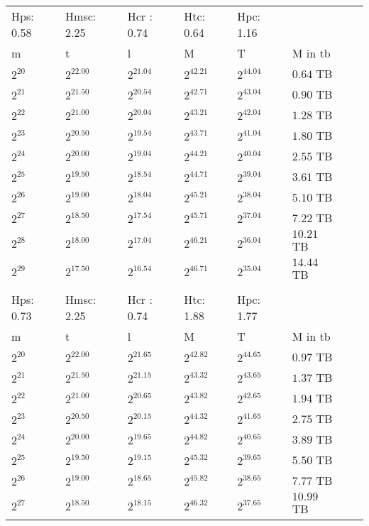\documentclass{article}
\begin{document}
\begin{tabular}{llllllll}
Hps: 0.58 & Hmsc: 2.25 & Hcr : 0.74 & Htc: 0.64 & Hpc: 1.16 &  \\
m & t & l & M & T & M in tb \\
$2^{20}$ & $2^{22.00}$ & $2^{21.04}$ & $2^{42.21}$ & $2^{44.04}$ & $0.64$ TB \\
$2^{21}$ & $2^{21.50}$ & $2^{20.54}$ & $2^{42.71}$ & $2^{43.04}$ & $0.90$ TB \\
$2^{22}$ & $2^{21.00}$ & $2^{20.04}$ & $2^{43.21}$ & $2^{42.04}$ & $1.28$ TB \\
$2^{23}$ & $2^{20.50}$ & $2^{19.54}$ & $2^{43.71}$ & $2^{41.04}$ & $1.80$ TB \\
$2^{24}$ & $2^{20.00}$ & $2^{19.04}$ & $2^{44.21}$ & $2^{40.04}$ & $2.55$ TB \\
$2^{25}$ & $2^{19.50}$ & $2^{18.54}$ & $2^{44.71}$ & $2^{39.04}$ & $3.61$ TB \\
$2^{26}$ & $2^{19.00}$ & $2^{18.04}$ & $2^{45.21}$ & $2^{38.04}$ & $5.10$ TB \\
$2^{27}$ & $2^{18.50}$ & $2^{17.54}$ & $2^{45.71}$ & $2^{37.04}$ & $7.22$ TB \\
$2^{28}$ & $2^{18.00}$ & $2^{17.04}$ & $2^{46.21}$ & $2^{36.04}$ & $10.21$ TB \\
$2^{29}$ & $2^{17.50}$ & $2^{16.54}$ & $2^{46.71}$ & $2^{35.04}$ & $14.44$ TB \\
 &  &  &  &  &  \\
Hps: 0.73 & Hmsc: 2.25 & Hcr : 0.74 & Htc: 1.88 & Hpc: 1.77 &  \\
m & t & l & M & T & M in tb \\
$2^{20}$ & $2^{22.00}$ & $2^{21.65}$ & $2^{42.82}$ & $2^{44.65}$ & $0.97$ TB \\
$2^{21}$ & $2^{21.50}$ & $2^{21.15}$ & $2^{43.32}$ & $2^{43.65}$ & $1.37$ TB \\
$2^{22}$ & $2^{21.00}$ & $2^{20.65}$ & $2^{43.82}$ & $2^{42.65}$ & $1.94$ TB \\
$2^{23}$ & $2^{20.50}$ & $2^{20.15}$ & $2^{44.32}$ & $2^{41.65}$ & $2.75$ TB \\
$2^{24}$ & $2^{20.00}$ & $2^{19.65}$ & $2^{44.82}$ & $2^{40.65}$ & $3.89$ TB \\
$2^{25}$ & $2^{19.50}$ & $2^{19.15}$ & $2^{45.32}$ & $2^{39.65}$ & $5.50$ TB \\
$2^{26}$ & $2^{19.00}$ & $2^{18.65}$ & $2^{45.82}$ & $2^{38.65}$ & $7.77$ TB \\
$2^{27}$ & $2^{18.50}$ & $2^{18.15}$ & $2^{46.32}$ & $2^{37.65}$ & $10.99$ TB \\

\end{tabular}
\end{document}
